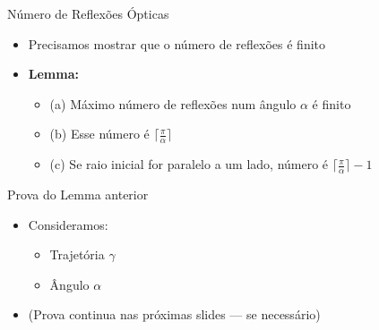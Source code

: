 \documentclass{beamer}
\begin{document}
\begin{frame}{Número de Reflexões Ópticas}
\begin{itemize}
  \item Precisamos mostrar que o número de reflexões é finito
  \item \textbf{Lemma:}
    \begin{itemize}
      \item (a) Máximo número de reflexões num ângulo $\alpha$ é finito
      \item (b) Esse número é $\lceil \frac{\pi}{\alpha} \rceil$
      \item (c) Se raio inicial for paralelo a um lado, número é $\lceil \frac{\pi}{\alpha} \rceil - 1$
    \end{itemize}
\end{itemize}
\end{frame}

\begin{frame}{Prova do Lemma anterior}
\begin{itemize}
  \item Consideramos:
    \begin{itemize}
      \item Trajetória $\gamma$
      \item Ângulo $\alpha$
    \end{itemize}
  \item (Prova continua nas próximas slides — se necessário)
\end{itemize}
\end{frame}
\end{document}
